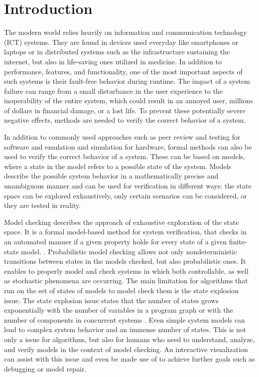 \documentclass[preview]{standalone}
\begin{document}
\section{Introduction}
	
The modern world relies heavily on information and communication technology (ICT) systems. They are found in devices used everyday like smartphones or laptops or in distributed systems such as the infrastructure sustaining the internet, but also in life-saving ones utilized in medicine. In addition to performance, features, and functionality, one of the most important aspects of such systems is their fault-free behavior during runtime. The impact of a system failure can range from a small disturbance in the user experience to the inoperability of the entire system, which could result in an annoyed user, millions of dollars in financial damage, or a lost life. To prevent these potentially severe negative effects, methods are needed to verify the correct behavior of a system.

In addition to commonly used approaches such as peer review and testing for software and emulation and simulation for hardware, formal methods can also be used to verify the correct behavior of a system. 
These can be based on models, where a state in the model refers to a possible state of the system. Models describe the possible system behavior in a mathematically precise and unambiguous manner and can be used for verification in different ways: the state space can be explored exhaustively, only certain scenarios can be considered, or they are tested in reality.

Model checking describes the approach of exhaustive exploration of the state space. It is a formal model-based method for system verification, that checks in an automated manner if a given property holds for every state of a given finite-state model. \cite[chs. 1.1 and 1.2]{Baier2008}. Probabilistic model checking allows not only nondeterministic transitions between states in the models checked, but also probabilistic ones. It enables to properly model and check systems in which both controllable, as well as stochastic phenomena are occurring. The main limitation for algorithms that run on the set of states of models to model check them is the state explosion issue. The state explosion issue states that the number of states grows exponentially with the number of variables in a program graph or with the number of components in concurrent systems \cite[ch. 2.3]{Baier2008}. Even simple system models can lead to complex system behavior and an immense number of states. This is not only a issue for algorithms, but also for humans who need to understand, analyze, and verify models in the context of model checking. An interactive visualization can assist with this issue and even be made use of to achieve further goals such as debugging or model repair. 
\end{document}
